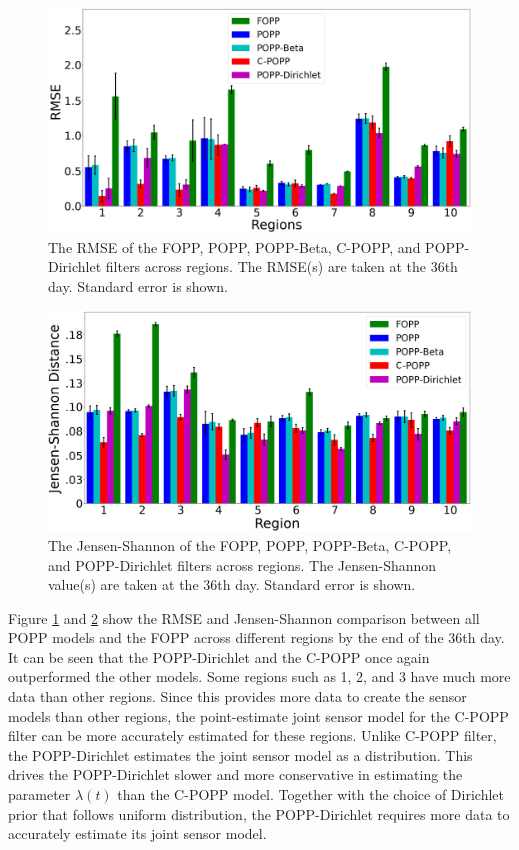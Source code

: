 \begin{figure}[t!]
	\centering
	\includegraphics[width=0.8\columnwidth]{./figures/fopp_popp_popb_npop_popd_rmse.png}
	\caption{The RMSE of the FOPP, POPP, POPP-Beta, C-POPP, and POPP-Dirichlet filters across regions. The RMSE(s) are taken at the 36th day. Standard error is shown.}
	\label{fig:fopp_popp_popb_npop_popd_rmse}
	\vspace{-10pt}
\end{figure}

\begin{figure}[t!]
	\centering
	\includegraphics[width=0.8\columnwidth]{./figures/fopp_popp_popb_npop_popd_kl.png}
	\caption{The Jensen-Shannon of the FOPP, POPP, POPP-Beta, C-POPP, and POPP-Dirichlet filters across regions. The Jensen-Shannon value(s) are taken at the 36th day. Standard error is shown.}
	\label{fig:fopp_popp_popb_npop_popd_kl}
	\vspace{-20pt}
\end{figure}

Figure \ref{fig:fopp_popp_popb_npop_popd_rmse} and \ref{fig:fopp_popp_popb_npop_popd_kl} show the RMSE and Jensen-Shannon comparison between all POPP models and the FOPP across different regions by the end of the 36th day. It can be seen that the POPP-Dirichlet and the C-POPP once again outperformed the other models. Some regions such as 1, 2, and 3 have much more data than other regions. Since this  provides  more data to create the sensor models than other regions, the point-estimate joint sensor model for the C-POPP filter can be more accurately estimated for these regions. Unlike C-POPP filter, the POPP-Dirichlet estimates the joint sensor model as a distribution. This drives the POPP-Dirichlet slower and more conservative in estimating the parameter $\lambda(t)$ than the C-POPP model. Together with the choice of Dirichlet prior that follows uniform distribution, the POPP-Dirichlet requires more data to accurately estimate its joint sensor model.


